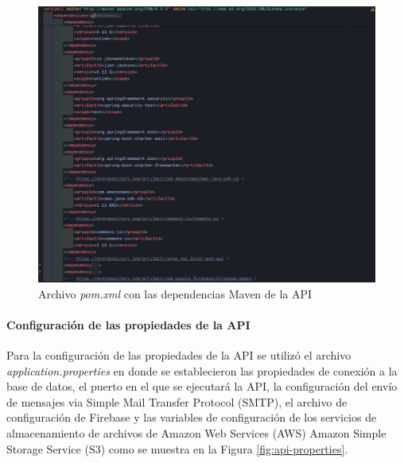 \begin{figure}[H]
    \centering
    \includegraphics[width=1\textwidth]{resources/images/maven}
    \caption{Archivo \textit{pom.xml} con las dependencias Maven de la API}
    \label{fig:api-dependencies}
\end{figure}

\paragraph{Configuración de las propiedades de la API}
Para la configuración de las propiedades de la API se utilizó el archivo \textit{application.properties} en donde se establecieron las propiedades de conexión a la base de datos, el puerto en el que se ejecutará la API, la configuración del envío de mensajes via Simple Mail Transfer Protocol (SMTP), el archivo de configuración de Firebase y las variables de configuración de los servicios de almacenamiento de archivos de Amazon Web Services (AWS) Amazon Simple Storage Service (S3) como se muestra en la Figura \ref{fig:api-properties}.

